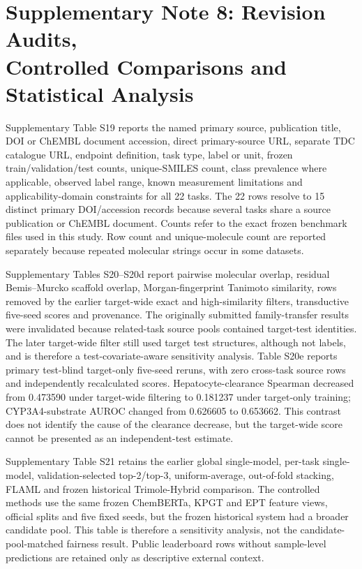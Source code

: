 \documentclass[10pt]{article}
\begin{document}
\section*{Supplementary Note 8: Revision Audits,\\Controlled Comparisons and Statistical Analysis}

Supplementary Table S19 reports the named primary source, publication title, DOI or ChEMBL document accession, direct primary-source URL, separate TDC catalogue URL, endpoint definition, task type, label or unit, frozen train/validation/test counts, unique-SMILES count, class prevalence where applicable, observed label range, known measurement limitations and applicability-domain constraints for all 22 tasks. The 22 rows resolve to 15 distinct primary DOI/accession records because several tasks share a source publication or ChEMBL document. Counts refer to the exact frozen benchmark files used in this study. Row count and unique-molecule count are reported separately because repeated molecular strings occur in some datasets.

Supplementary Tables S20--S20d report pairwise molecular overlap, residual Bemis--Murcko scaffold overlap, Morgan-fingerprint Tanimoto similarity, rows removed by the earlier target-wide exact and high-similarity filters, transductive five-seed scores and provenance. The originally submitted family-transfer results were invalidated because related-task source pools contained target-test identities. The later target-wide filter still used target test structures, although not labels, and is therefore a test-covariate-aware sensitivity analysis. Table S20e reports primary test-blind target-only five-seed reruns, with zero cross-task source rows and independently recalculated scores. Hepatocyte-clearance Spearman decreased from 0.473590 under target-wide filtering to 0.181237 under target-only training; CYP3A4-substrate AUROC changed from 0.626605 to 0.653662. This contrast does not identify the cause of the clearance decrease, but the target-wide score cannot be presented as an independent-test estimate.

Supplementary Table S21 retains the earlier global single-model, per-task single-model, validation-selected top-2/top-3, uniform-average, out-of-fold stacking, FLAML and frozen historical Trimole-Hybrid comparison. The controlled methods use the same frozen ChemBERTa, KPGT and EPT feature views, official splits and five fixed seeds, but the frozen historical system had a broader candidate pool. This table is therefore a sensitivity analysis, not the candidate-pool-matched fairness result. Public leaderboard rows without sample-level predictions are retained only as descriptive external context.
\end{document}
